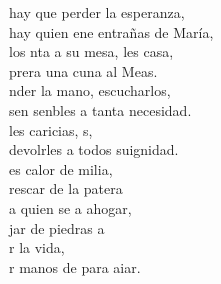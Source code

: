 \documentclass[12pt]{article}
\begin{document}
\begin{multicols*}{2}
\begin{cancion}
	 hay que perder la esperanza,\\
	hay quien ene entrañas de María,\\
	los nta a su mesa, les casa,\\
	prera una cuna al Meas. \\
	nder la mano, escucharlos,\\
	sen senbles a tanta necesidad.\\
	les caricias, s,\\
	devolrles a todos suignidad.\\
	es calor de milia,\\
	rescar de la patera \\
	a quien se  a ahogar,\\
	jar de  piedras a\\
	r la vida,\\
	r manos de  para aiar.\\
\end{cancion}%


\end{multicols*}
\end{document}
